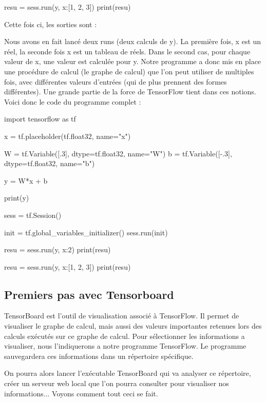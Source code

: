 \documentclass[a4paper,11pt]{book}
\theoremstyle{theo}
\begin{document}
\begin{mypython} 
resu = sess.run(y, {x:[1, 2, 3]}) 
print(resu)
\end{mypython} 

Cette fois ci, les sorties sont :

\begin{mypython} 
[0.3]
[0.  0.3 0.6]
\end{mypython} 

Nous avons en fait lancé deux runs (deux calculs de y). La première fois, x est un réel, la seconde fois x est un tableau de réels. Dans le second cas, pour chaque valeur de x, une valeur est calculée pour y.
Notre programme a donc mis en place une procédure de calcul (le graphe de calcul) que l'on peut utiliser de multiples fois, avec différentes valeurs d'entrées (qui de plus prennent des formes différentes).
Une grande partie de la force de TensorFlow tient dans ces notions.
Voici donc le code du programme complet :

\begin{mypython} 
import tensorflow as tf

x = tf.placeholder(tf.float32, name="x")

W = tf.Variable([.3], dtype=tf.float32, name="W")
b = tf.Variable([-.3], dtype=tf.float32, name="b")

y = W*x + b

print(y)

sess = tf.Session()

init = tf.global_variables_initializer()
sess.run(init)

resu = sess.run(y, {x:2}) 
print(resu)

resu = sess.run(y, {x:[1, 2, 3]}) 
print(resu)
\end{mypython} 

\subsection{Premiers pas avec Tensorboard}

TensorBoard est l'outil de visualisation associé à TensorFlow. Il permet de visualiser le graphe de calcul, mais aussi des valeurs importantes retenues lors des calculs exécutés sur ce graphe de calcul.
Pour sélectionner les informations a visualiser, nous l'indiquerons a notre programme TensorFlow. Le programme sauvegardera ces informations dans un répertoire spécifique.

On pourra alors lancer l'exécutable TensorBoard qui va analyser ce répertoire, créer un serveur web local que l'on pourra consulter pour visualiser nos informations...
Voyons comment tout ceci se fait.
\end{document}
